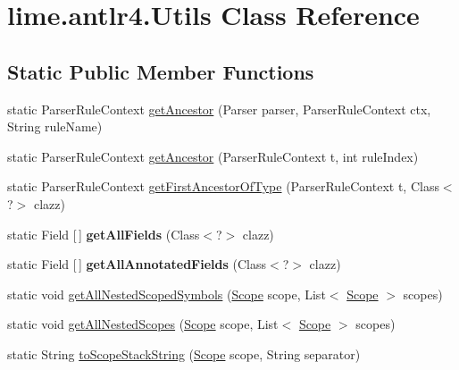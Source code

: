 \hypertarget{classlime_1_1antlr4_1_1Utils}{}\section{lime.\+antlr4.\+Utils Class Reference}
\label{classlime_1_1antlr4_1_1Utils}
\subsection*{Static Public Member Functions}
\begin{DoxyCompactItemize}
\item 
static Parser\+Rule\+Context \hyperlink{classlime_1_1antlr4_1_1Utils_a9eedc911b30d825b87b688cd7a2c4d66}{get\+Ancestor} (Parser parser, Parser\+Rule\+Context ctx, String rule\+Name)
\item 
static Parser\+Rule\+Context \hyperlink{classlime_1_1antlr4_1_1Utils_a3caa3558f35e94dfb457f73e6f33f59e}{get\+Ancestor} (Parser\+Rule\+Context t, int rule\+Index)
\item 
static Parser\+Rule\+Context \hyperlink{classlime_1_1antlr4_1_1Utils_adbc7653fb02c8f435de3c6bce42289d2}{get\+First\+Ancestor\+Of\+Type} (Parser\+Rule\+Context t, Class$<$?$>$ clazz)
\item 
\mbox{\label{classlime_1_1antlr4_1_1Utils_a159108e7536890056d679476019a6ec5}} 
static Field \mbox{[}$\,$\mbox{]} {\bfseries get\+All\+Fields} (Class$<$?$>$ clazz)
\item 
\mbox{\label{classlime_1_1antlr4_1_1Utils_a4c599facaeffea785d6569096eebb245}} 
static Field \mbox{[}$\,$\mbox{]} {\bfseries get\+All\+Annotated\+Fields} (Class$<$?$>$ clazz)
\item 
static void \hyperlink{classlime_1_1antlr4_1_1Utils_ae4c1e656e69475dbff0b7f929bd326d1}{get\+All\+Nested\+Scoped\+Symbols} (\hyperlink{interfacelime_1_1antlr4_1_1Scope}{Scope} scope, List$<$ \hyperlink{interfacelime_1_1antlr4_1_1Scope}{Scope} $>$ scopes)
\item 
static void \hyperlink{classlime_1_1antlr4_1_1Utils_a1ed5adf856e7f1ca2abaccab52b27238}{get\+All\+Nested\+Scopes} (\hyperlink{interfacelime_1_1antlr4_1_1Scope}{Scope} scope, List$<$ \hyperlink{interfacelime_1_1antlr4_1_1Scope}{Scope} $>$ scopes)
\item 
static String \hyperlink{classlime_1_1antlr4_1_1Utils_a978f0238c4f1d5992ab04c7533cb17c3}{to\+Scope\+Stack\+String} (\hyperlink{interfacelime_1_1antlr4_1_1Scope}{Scope} scope, String separator)

\end{DoxyCompactItemize}
